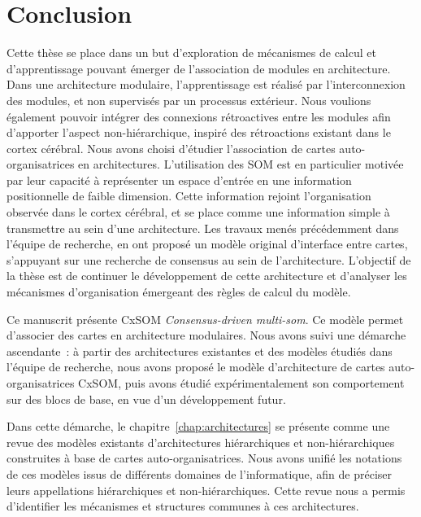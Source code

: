 \chapter*{Conclusion}

Cette thèse se place dans un but d'exploration de mécanismes de calcul et d'apprentissage pouvant émerger de l'association de modules en architecture.
Dans une architecture modulaire, l'apprentissage est réalisé par l'interconnexion des modules, et non supervisés par un processus extérieur.
Nous voulions également pouvoir intégrer des connexions rétroactives entre les modules afin d'apporter l'aspect non-hiérarchique, inspiré des rétroactions existant dans le cortex cérébral. 
Nous avons choisi d'étudier l'association de cartes auto-organisatrices en architectures. 
L'utilisation des SOM est en particulier motivée par leur capacité à représenter un espace d'entrée en une information positionnelle de faible dimension. Cette information rejoint l'organisation observée dans le cortex cérébral, et se place comme une information simple à transmettre au sein d'une architecture.
Les travaux menés précédemment dans l'équipe de recherche, en \cite{menard05,khouzam_2013,baheux_towards_2014} ont proposé un modèle original d'interface entre cartes, s'appuyant sur une recherche de consensus au sein de l'architecture. L'objectif de la thèse est de continuer le développement de cette architecture et d'analyser les mécanismes d'organisation émergeant des règles de calcul du modèle. 


Ce manuscrit présente CxSOM \emph{Consensus-driven multi-som}. Ce modèle permet d'associer des cartes en architecture modulaires.
Nous avons suivi une démarche ascendante~: à partir des architectures existantes et des modèles étudiés dans l'équipe de recherche, nous avons proposé le modèle d'architecture de cartes auto-organisatrices CxSOM, puis avons étudié expérimentalement son comportement sur des blocs de base, en vue d'un développement futur.

Dans cette démarche, le chapitre~\ref{chap:architectures} se présente comme une revue des modèles existants d'architectures hiérarchiques et non-hiérarchiques construites à base de cartes auto-organisatrices. 
Nous avons unifié les notations de ces modèles issus de différents domaines de l'informatique, afin de préciser leurs appellations hiérarchiques et non-hiérarchiques. Cette revue nous a permis d'identifier les mécanismes et structures communes à ces architectures.

